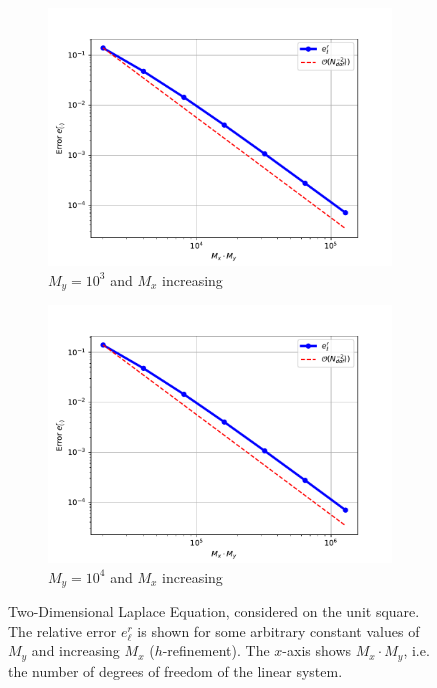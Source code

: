 \begin{figure}[t]
\begin{subfigure}{.5\textwidth}
  \includegraphics[width=\linewidth]{plots/task3bMy100.pdf}
  \caption{$M_y = 10^3$ and $M_x$ increasing}
\end{subfigure}
\begin{subfigure}{.5\textwidth}
  \centering
  \includegraphics[width=\linewidth]{plots/task3bMy500.pdf}  \caption{$M_y = 10^4$ and $M_x$ increasing}
\end{subfigure}
\caption{Two-Dimensional Laplace Equation, considered on the unit square. The relative error $e^r_{\ell}$ is shown for some arbitrary constant values of $M_y$ and increasing $M_x$ ($h$-refinement). The $x$-axis shows $M_x \cdot M_y$, i.e. the number of degrees of freedom of the linear system.}
\label{subfigurestask3b1}
\end{figure}

